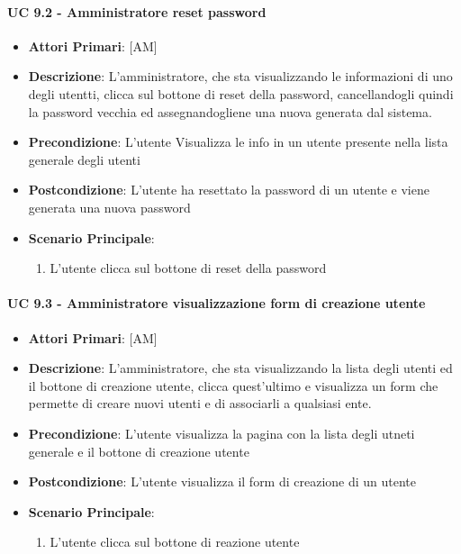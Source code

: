 			\paragraph{UC 9.2 -  Amministratore reset password}
			\begin{itemize}
				\item \textbf{Attori Primari}: [AM]
				\item \textbf{Descrizione}: L'amministratore, che sta visualizzando le informazioni di uno degli utentti, clicca sul bottone di reset della password, cancellandogli quindi la password vecchia ed assegnandogliene una nuova generata dal sistema.
				\item \textbf{Precondizione}: L'utente Visualizza le info in un utente presente nella lista generale degli utenti
				\item \textbf{Postcondizione}: L'utente ha resettato la password di un utente e viene generata una nuova password
				\item \textbf{Scenario Principale}:
				\begin{enumerate}
					\item{L'utente clicca sul bottone di reset della password}
				\end{enumerate}	
			\end{itemize}

			\paragraph{UC 9.3 - Amministratore visualizzazione form di creazione utente}
			\begin{itemize}
				\item \textbf{Attori Primari}: [AM]
				\item \textbf{Descrizione}: L'amministratore, che sta visualizzando la lista degli utenti ed il bottone di creazione utente, clicca quest'ultimo e visualizza un form che permette di creare nuovi utenti e di associarli a qualsiasi ente.
				\item \textbf{Precondizione}: L'utente visualizza la pagina con la lista degli utneti generale e il bottone di creazione utente 
				\item \textbf{Postcondizione}: L'utente visualizza il form di creazione di un utente
				\item \textbf{Scenario Principale}:
				\begin{enumerate}
					\item{L'utente clicca sul bottone di reazione utente}
				\end{enumerate}	
			\end{itemize}	

